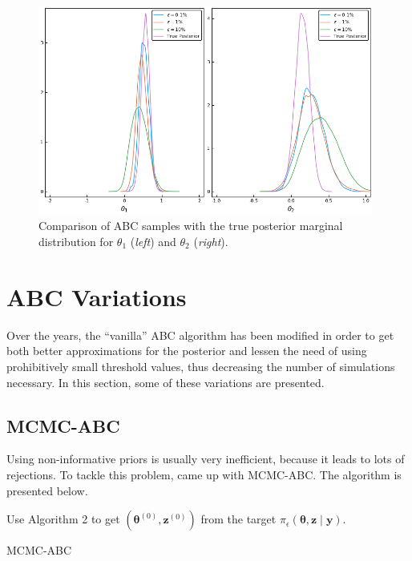 \documentclass[runningheads]{llncs}
\begin{document}
    \begin{figure}[H]
        \centering
        \includegraphics[width=11cm]{images/ABCmodel1_Marginal.png}
        \caption{Comparison of ABC samples with the true posterior
        marginal distribution for $\theta_1$ (\textit{left}) and
        $\theta_2$ (\textit{right}).
        }
        \label{fig:calibration2}
    \end{figure}


\newpage
\section{ABC Variations}
Over the years, the ``vanilla'' ABC algorithm has
been modified in order to get both better approximations
for the posterior
and lessen the need of using prohibitively small
threshold values, thus decreasing the number
of simulations necessary. In this section,
some of these variations are presented.
\subsection{MCMC-ABC}
\label{subsec:statistical-summaries}

Using non-informative priors is usually very inefficient,
because it leads to lots of rejections. To tackle this
problem, \citet{Marjoram2013} came up with MCMC-ABC.
The algorithm is presented below.

\hfill\break
\begin{algorithm}[H]
\SetAlgoLined
Use Algorithm 2 to get $(\bm \theta^{(0)}, \bm z^{(0)})$ from the
target $\pi_\epsilon(\bm \theta, \bm z \mid \bm y)$.

 \caption{MCMC-ABC}
\end{algorithm}
\hfill\break
\end{document}

